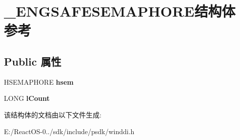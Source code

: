 \hypertarget{struct___e_n_g_s_a_f_e_s_e_m_a_p_h_o_r_e}{}\section{\+\_\+\+E\+N\+G\+S\+A\+F\+E\+S\+E\+M\+A\+P\+H\+O\+R\+E结构体 参考}
\label{struct___e_n_g_s_a_f_e_s_e_m_a_p_h_o_r_e}
\subsection*{Public 属性}
\begin{DoxyCompactItemize}
\item 
\mbox{\label{struct___e_n_g_s_a_f_e_s_e_m_a_p_h_o_r_e_a12c2723439adc3e773646510611ab9fc}} 
H\+S\+E\+M\+A\+P\+H\+O\+RE {\bfseries hsem}
\item 
\mbox{\label{struct___e_n_g_s_a_f_e_s_e_m_a_p_h_o_r_e_a7ab67e1d0a0a4e2d32207080ab2cac6e}} 
L\+O\+NG {\bfseries l\+Count}
\end{DoxyCompactItemize}


该结构体的文档由以下文件生成\+:\begin{DoxyCompactItemize}
\item 
E\+:/\+React\+O\+S-\/0../sdk/include/psdk/winddi.\+h\end{DoxyCompactItemize}
